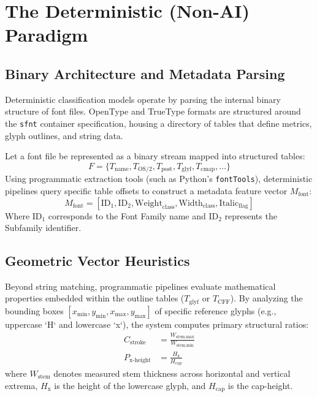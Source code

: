 \documentclass[11pt, onecolumn, a4paper]{article}
\begin{document}
\section{The Deterministic (Non-AI) Paradigm}

\subsection{Binary Architecture and Metadata Parsing}
Deterministic classification models operate by parsing the internal binary structure of font files. OpenType and TrueType formats are structured around the \texttt{sfnt} container specification, housing a directory of tables that define metrics, glyph outlines, and string data. 

Let a font file be represented as a binary stream mapped into structured tables:
\begin{equation}
    F = \{ T_{\text{name}}, T_{\text{OS/2}}, T_{\text{post}}, T_{\text{glyf}}, T_{\text{cmap}}, \dots \}
\end{equation}
Using programmatic extraction tools (such as Python's \texttt{fontTools}), deterministic pipelines query specific table offsets to construct a metadata feature vector $M_{\text{font}}$:
\begin{equation}
    M_{\text{font}} = [ \text{ID}_1, \text{ID}_2, \text{Weight}_{\text{class}}, \text{Width}_{\text{class}}, \text{Italic}_{\text{flag}} ]
\end{equation}
Where $\text{ID}_1$ corresponds to the Font Family name and $\text{ID}_2$ represents the Subfamily identifier.

\subsection{Geometric Vector Heuristics}
Beyond string matching, programmatic pipelines evaluate mathematical properties embedded within the outline tables ($T_{\text{glyf}}$ or $T_{\text{CFF}}$). By analyzing the bounding boxes $[x_{\min}, y_{\min}, x_{\max}, y_{\max}]$ of specific reference glyphs (e.g., uppercase `H` and lowercase `x`), the system computes primary structural ratios:
\begin{align}
    C_{\text{stroke}} &= \frac{W_{\text{stem,max}}}{W_{\text{stem,min}}} \\
    P_{\text{x-height}} &= \frac{H_{\text{x}}}{H_{\text{cap}}}
\end{align}
where $W_{\text{stem}}$ denotes measured stem thickness across horizontal and vertical extrema, $H_{\text{x}}$ is the height of the lowercase glyph, and $H_{\text{cap}}$ is the cap-height.
\end{document}
